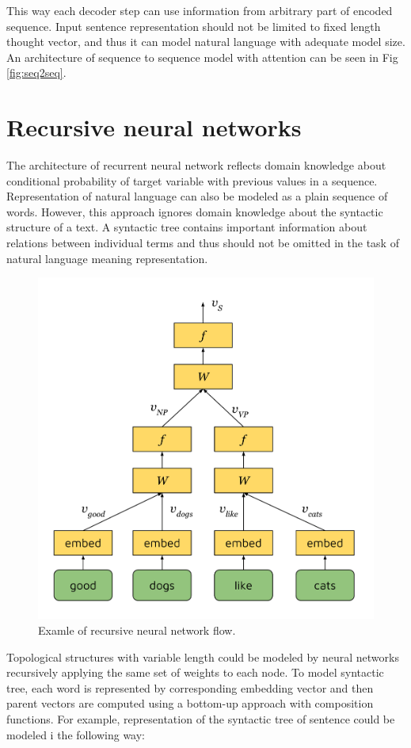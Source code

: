 This way each decoder step can use information from arbitrary part of encoded sequence. Input sentence representation should not be limited to fixed length thought vector, and thus it can model natural language with adequate model size. An architecture of sequence to sequence model with attention can be seen in Fig \ref{fig:seq2seq}.

\section{Recursive neural networks}
The architecture of recurrent neural network reflects domain knowledge about conditional probability of target variable with previous values in a sequence. Representation of natural language can also be modeled as a plain sequence of words. However, this approach ignores domain knowledge about the syntactic structure of a text. A syntactic tree contains important information about relations between individual terms and thus should not be omitted in the task of natural language meaning representation.
\begin{figure}
\centering
\includegraphics{Figures/rvnn}
\decoRule
\caption[RvNN flow]{Examle of recursive neural network flow.}
\label{fig:rvnn}
\end{figure}
Topological structures with variable length could be modeled by neural networks recursively applying the same set of weights to each node. To model syntactic tree, each word is represented by corresponding embedding vector and then parent vectors are computed using a bottom-up approach with composition functions. For example, representation of the syntactic tree of sentence  could be modeled i the following way:
